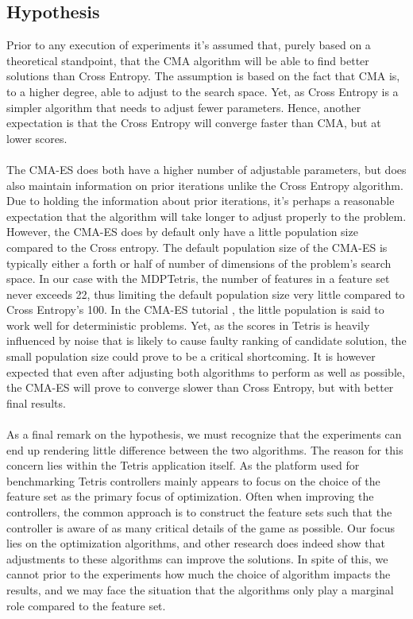 \subsection{Hypothesis}

Prior to any execution of experiments it's assumed that, purely based 
on a theoretical standpoint, that the CMA algorithm will be able to 
find better solutions than Cross Entropy. The assumption is based 
on the fact that CMA is, to a higher degree, able to adjust to the 
search space. Yet, as Cross Entropy is a simpler algorithm that needs 
to adjust fewer parameters. Hence, another expectation is that the 
Cross Entropy will converge faster than CMA, but at lower scores.\\
\\
The CMA-ES does both have a higher number of adjustable parameters, but does also
maintain information on prior iterations unlike the Cross Entropy algorithm.
Due to holding the information about prior iterations, it's perhaps a reasonable
expectation that the algorithm will take longer to adjust properly to the
problem. However, the CMA-ES does by default only have a little population size 
compared to the Cross entropy. The default population size of the CMA-ES is
typically either a forth or half of number of dimensions of the problem's search space.
In our case with the MDPTetris, the number of features in a feature set never exceeds
22, thus limiting the default population size very little compared to Cross Entropy's 
100. In the CMA-ES tutorial \citep{hansen2011}, the little population is said to
work well for deterministic problems. Yet, as the scores in Tetris is heavily
influenced by noise that is likely to cause faulty ranking of candidate solution,
the small population size could prove to be a critical shortcoming.
It is however expected that even after adjusting both algorithms to perform as 
well as possible, the CMA-ES will prove to converge slower than Cross Entropy, but
with better final results.\\
\\
As a final remark on the hypothesis, we must recognize that the experiments can 
end up rendering little difference between the two algorithms. The reason for 
this concern lies within the Tetris application itself. As the platform used for benchmarking 
Tetris controllers mainly appears to focus on the choice of the feature set as the primary
focus of optimization. Often when improving the controllers, the common approach is to
construct the feature sets such that the controller is aware of as many critical 
details of the game as possible. Our focus lies on the optimization algorithms,
and other research does indeed show that adjustments to these algorithms can 
improve the solutions. In spite of this, we cannot prior to the experiments how much
the choice of algorithm impacts the results, and we may face the situation that 
the algorithms only play a marginal role compared to the feature set.
